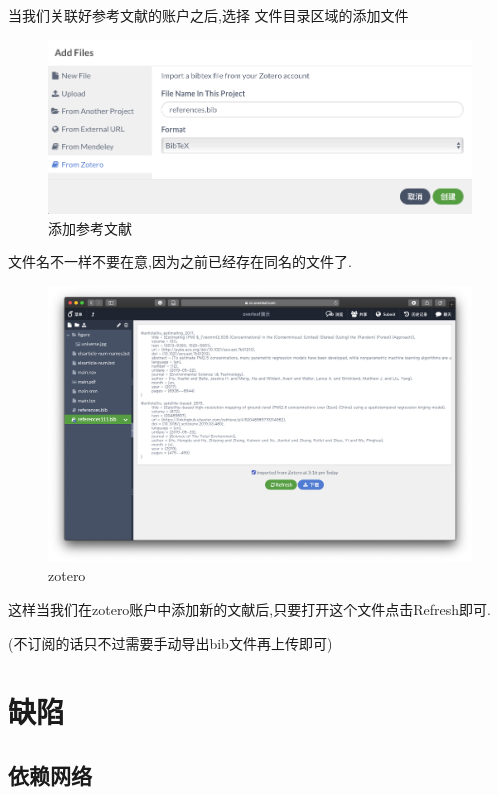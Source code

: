 \documentclass[]{ctexbook}
\begin{document}
当我们关联好参考文献的账户之后,选择 文件目录区域的添加文件

\begin{figure}
\centering
\includegraphics{figure/addfiles.png}
\caption{添加参考文献}
\end{figure}

文件名不一样不要在意,因为之前已经存在同名的文件了.

\begin{figure}
\centering
\includegraphics{figure/zotero.png}
\caption{zotero}
\end{figure}

这样当我们在zotero账户中添加新的文献后,只要打开这个文件点击Refresh即可.

(不订阅的话只不过需要手动导出bib文件再上传即可)

\hypertarget{section-16}{%
\chapter{缺陷}\label{section-16}}

\hypertarget{section-17}{%
\section{依赖网络}\label{section-17}}
\end{document}
